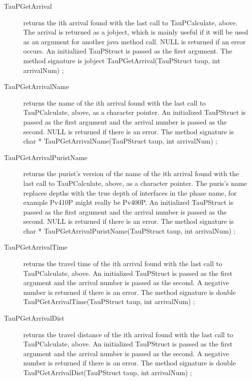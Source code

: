 \begin{center}
\begin{description}
\item[TauPGetArrival] returns the ith arrival found with the last 
call to TauPCalculate, above. The arrival is returned as a jobject, which
is mainly useful if it will be used as an argument for another java method
call. NULL is returned if an
error occurs. An initialized TauPStruct is passed as the first argument.
The method signature is\newline
jobject TauPGetArrival(TauPStruct taup, int arrivalNum) {};

\item[TauPGetArrivalName] returns the name of the ith arrival 
found with the last call to TauPCalculate, above, as a
character pointer. An initialized TauPStruct is passed as the 
first argument and the arrival number is passed as the second.
NULL is returned if there is an error.
The method signature is\newline
char * TauPGetArrivalName(TauPStruct taup, int arrivalNum) {};

\item[TauPGetArrivalPuristName] returns the purist's version of the
name of the ith arrival 
found with the last call to TauPCalculate, above, as a
character pointer. The puris's name replaces depths with the true depth
of interfaces in the phase name, for example Pv410P might really be
Pv400P.
An initialized TauPStruct is passed as the 
first argument and the arrival number is passed as the second.
NULL is returned if there is an error.
The method signature is\newline
char * TauPGetArrivalPuristName(TauPStruct taup, int arrivalNum) {};

\item[TauPGetArrivalTime] returns the travel time of the ith arrival
found with the last call to TauPCalculate, above.
An initialized TauPStruct is passed as the first argument and 
the arrival number is passed as the second.
A negative number is returned if there is an error.
The method signature is\newline
double TauPGetArrivalTime(TauPStruct taup, int arrivalNum) {};

\item[TauPGetArrivalDist] returns the travel distance of the ith arrival
found with the last call to TauPCalculate, above.
An initialized TauPStruct is passed as the first argument and 
the arrival number is passed as the second.
A negative number is returned if there is an error.
The method signature is\newline
double TauPGetArrivalDist(TauPStruct taup, int arrivalNum) {};


\end{description}
\end{center}
